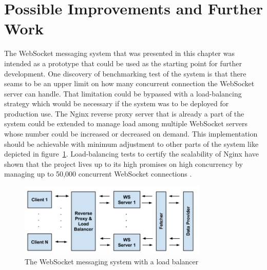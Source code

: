 \section{Possible Improvements and Further Work}

The WebSocket messaging system that was presented in this chapter was intended as a prototype that could be used as the starting point for further development. One discovery of benchmarking test of the system is that there seams to be an upper limit on how many concurrent connection the WebSocket server can handle. That limitation could be bypassed with a load-balancing strategy which would be necessary if the system was to be deployed for production use. The Nginx reverse proxy server that is already a part of the system could be extended to manage load among multiple WebSocket servers whose number could be increased or decreased on demand. This implementation should be achievable with minimum adjustment to other parts of the system like depicted in figure~\ref{fig:websocketMessagingSystemLoadBalancer}. Load-balancing tests to certify the scalability of Nginx have shown that the project lives up to its high promises on high concurrency by managing up to 50,000 concurrent WebSocket connections \cite{nginxWebsocket}.
\\
\begin{figure}[h!]
	\centering
	\includegraphics[width=0.8\textwidth]{images/websocketMessagingSystemLoadBalancer}
	\caption{The WebSocket messaging system with a load balancer}
	\label{fig:websocketMessagingSystemLoadBalancer}
\end{figure}

